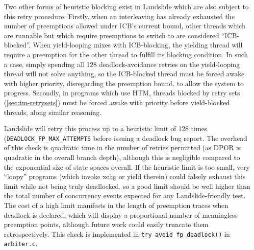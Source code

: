 Two other forms of heuristic blocking exist in Landslide which are also subject to this retry procedure.
Firstly, when an interleaving has already exhausted the number of preemptions allowed under ICB's current bound,
other threads which are runnable but which require preemptions to switch to are considered ``ICB-blocked''.
When yield-looping mixes with ICB-blocking, the yielding thread will require a preemption
for the other thread to fulfill its blocking condition.
In such a case, simply spending all 128 deadlock-avoidance retries on the yield-looping thread will not solve anything,
so the ICB-blocked thread must be forced awake with higher priority,
disregarding the preemption bound,
to allow the system to progress.
Secondly, in programs which use HTM,
threads blocked by retry sets (\cref{sec:tm-retrysets})
must be forced awake with priority before yield-blocked threads,
along similar reasoning.

Landslide will retry this process up to a heuristic limit of 128 times ({\tt DEADLOCK\_FP\_MAX\_\allowbreak{}ATTEMPTS}
before issuing a deadlock bug report.
The overhead of this check is quadratic time in the number of retries permitted
(as DPOR is quadratic in the overall branch depth),
although this is negligible compared to the exponential size of state spaces overall.
If the heuristic limit is too small, very ``loopy'' programs
(which invoke xchg or yield therein)
could falsely exhaust this limit while not being truly deadlocked,
so a good limit should be well higher than the total number of concurrency events expected for any Landslide-friendly test.
The cost of a high limit manifests in the length of preemption traces when deadlock is declared,
which will display a proportional number of meaningless preemption points,
although future work could easily truncate them retrospectively.
This check is implemented in {\tt try\_avoid\_fp\_deadlock()} in {\tt arbiter.c}.
